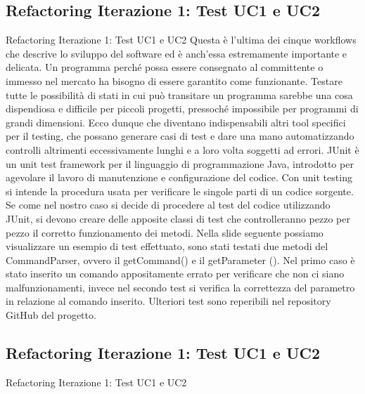 \subsection {Refactoring Iterazione 1: Test UC1 e UC2}
 \begin{frame}[allowframebreaks] {Refactoring Iterazione 1: Test UC1 e UC2}
   Questa è l'ultima dei cinque workflows che descrive lo sviluppo del software ed è anch'essa estremamente importante e delicata. Un programma perché possa 
   essere consegnato al committente o immesso nel mercato ha bisogno di essere garantito come funzionante. Testare tutte le possibilità di stati in cui può 
   transitare un programma sarebbe una cosa dispendiosa e difficile per piccoli progetti, pressoché impossibile per programmi di grandi dimensioni. Ecco dunque che 
   diventano indispensabili altri tool specifici per il testing, che possano generare casi di test e dare una mano automatizzando controlli altrimenti
   eccessivamente lunghi e a loro volta soggetti ad errori.
   \newline
   JUnit è un unit test framework per il linguaggio di programmazione Java, introdotto per agevolare il lavoro di manutenzione e configurazione del codice.
   \newline 
   Con unit testing si intende la procedura usata per verificare le singole parti di un codice sorgente.
   Se come nel nostro caso si decide di procedere al test del codice utilizzando JUnit, si devono creare delle apposite classi di test che controlleranno pezzo per   
   pezzo il corretto funzionamento dei metodi. 
   \newline
   Nella slide seguente possiamo visualizzare un esempio di test effettuato, sono stati testati due metodi del CommandParser, ovvero il getCommand() e il getParameter
   (). Nel primo caso è stato inserito un comando appositamente errato per verificare che non ci siano malfunzionamenti, invece nel secondo test si verifica la   
   correttezza del parametro in relazione al comando inserito. 
   \newline
   Ulteriori test sono reperibili nel repository  GitHub del progetto.
\end{frame}

\subsection {Refactoring Iterazione 1: Test UC1 e UC2}
 \begin{frame}{Refactoring Iterazione 1: Test UC1 e UC2}
  
\end{frame}

